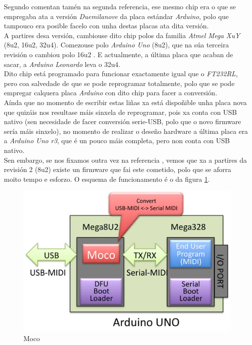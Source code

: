     Segundo comentan tamén na segunda referencia, ese mesmo chip era o que se
    empregaba ata a versión \textit{Duemilanove} \cite{ArduinoDuemilanove} da
    placa estándar \textit{Arduino}, polo que tampouco era posible facelo con
    unha destas placas ata dita versión. \\

    A partires desa versión, cambiouse dito chip polos da familia
    \textit{Atmel Mega XuY} (8u2, 16u2, 32u4). Comezouse polo
    \textit{Arduino Uno} (8u2), que na súa terceira revisión o cambiou polo
    16u2 \cite{ArduinoUno}. E actualmente, a última placa que acaban de sacar,
    a \textit{Arduino Leonardo} \cite{ArduinoLeonardo} leva o 32u4. \\

    Dito chip está programado para funcionar exactamente igual que o
    \textit{FT232RL}, pero coa salvedade de que se pode reprogramar totalmente,
    polo que se pode empregar calquera placa \textit{Arduino} con dito chip
    para facer a conversión. \\

    Aínda que no momento de escribir estas liñas xa está dispoñible unha placa
    nova \cite{ArduinoLeonardo} que quizáis nos resultase máis sinxela de
    reprogramar, pois xa conta con USB nativo (sen necesidade de facer
    conversión serie-USB, polo que o novo firmware sería máis sinxelo), no
    momento de realizar o deseño hardware a última placa era a
    \textit{Arduino Uno r3}, que é un pouco máis completa, pero non conta con
    USB nativo. \\

    Sen embargo, se nos fixamos outra vez na referencia \cite{Moco}, vemos que
    xa a partires da revisión 2 (8u2) existe un firmware que fai este cometido,
    polo que se aforra moito tempo e esforzo. O esquema de funcionamento é o da
    figura \ref{figura:Moco2}.

    \begin{figure}[htbp]
     \centering
     \includegraphics[scale=0.3,keepaspectratio=true]{./imagenes/moco.jpg}
     \caption{Moco}
     \label{figura:Moco2}
    \end{figure}

